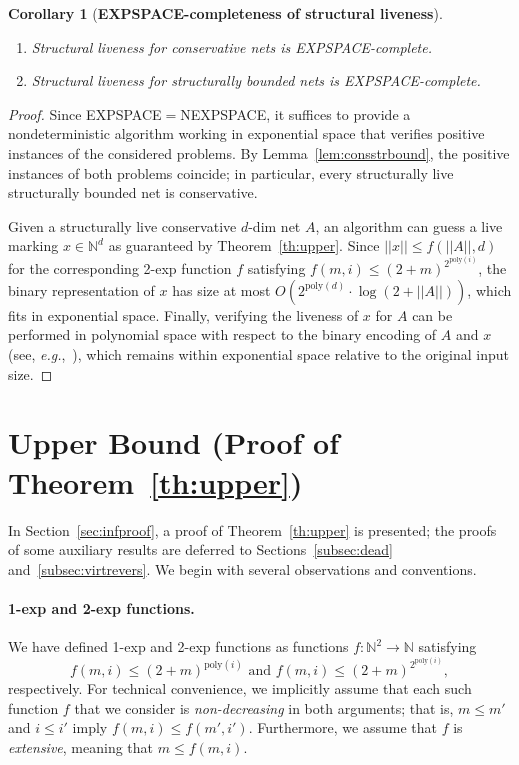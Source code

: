 \documentclass[11pt,a4paper]{amsart}
\newcommand{\nnorm}[1]{||#1||}
\newcommand{\Nat}{\mathbb{N}}
\newcommand{\setN}{\Nat}
\def\eg{{\em e.g.}}
\theoremstyle{plain}
\newtheorem{cor}[thm]{Corollary}
\theoremstyle{definition}
\theoremstyle{defC}
\theoremstyle{thmC}
\begin{document}
\begin{cor}[\textbf{EXPSPACE-completeness of structural liveness}]\label{cor:conservEScomplete}
\hfill
	\begin{enumerate}
		\item			
	Structural liveness for conservative nets is EXPSPACE-complete.
\item
	Structural liveness for structurally bounded nets is EXPSPACE-complete.
	\end{enumerate}
	\end{cor}	
\begin{proof}
	Since EXPSPACE$=$NEXPSPACE,
it suffices to provide a nondeterministic algorithm working in
	exponential space
	that verifies positive instances of the considered problems.
	By Lemma~\ref{lem:consstrbound}, the positive instances of
	both problems coincide; in particular, every structurally live
	structurally bounded net is conservative. 

	Given a structurally live conservative $d$-dim net $A$, an 
	algorithm can guess a live
	marking $x\in\setN^d$ as guaranteed by Theorem~\ref{th:upper}.
 Since  $\nnorm{x}\leq f(\nnorm{A},d)$ for the corresponding 2-exp function
	$f$
	satisfying	$f(m,i)\leq(2+m)^{2^{\text{poly}(i)}}$, the
	binary representation of $x$ has size at most
	$O(2^{\text{poly}(d)}\cdot\log (2+\nnorm{A}))$, which fits in exponential space.
Finally, verifying the liveness of $x$ for $A$ can be performed in
	polynomial space with respect to
	the binary encoding of $A$ and $x$ (see, \eg,~\cite[Lemma
	5]{DBLP:conf/apn/MayrW14}), which remains within exponential
	space relative to the original input size. 
\end{proof}
\section{Upper Bound (Proof of Theorem~\ref{th:upper})}\label{sec:upperbound}
In Section~\ref{sec:infproof}, a proof of Theorem~\ref{th:upper} is
presented; the proofs of some auxiliary results are deferred to
Sections~\ref{subsec:dead} and~\ref{subsec:virtrevers}. 
We begin with several
observations and conventions.


\paragraph{1-exp and 2-exp functions.}

We have defined 1-exp and 2-exp functions as functions $f\colon\setN^2\to\setN$
satisfying
\begin{equation*}
	f(m,i)\leq (2+m)^{\text{poly}(i)}\text{ and }
f(m,i)\leq (2+m)^{2^{\text{poly}(i)}},
\end{equation*}
	respectively.
For technical convenience, we implicitly assume that each such 
function $f$ that we consider is \emph{non-decreasing} in both arguments; that is, 
$m \leq m'$ and $i \leq i'$ imply $f(m, i) \leq f(m', i')$. 
Furthermore, we assume that $f$ is \emph{extensive}, meaning that $m \leq f(m,i)$.
\end{document}
